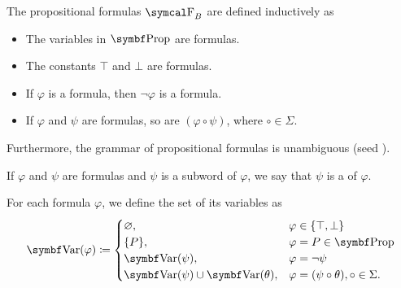 \begin{definition}\label{def:propositional_formulas}
  The propositional formulas \( \CF_B \) are defined inductively as
  \begin{itemize}
    \item The variables in \( \Bold{Prop} \) are formulas.
    \item The constants \( \top \) and \( \bot \) are formulas.
    \item If \( \varphi \) is a formula, then \( \neg \varphi \) is a formula.
    \item If \( \varphi \) and \( \psi \) are formulas, so are \( (\varphi \circ \psi) \), where \( \circ \in \Sigma \).
  \end{itemize}

  Furthermore, the grammar of propositional formulas is unambiguous (seed ).

  If \( \varphi \) and \( \psi \) are formulas and \( \psi \) is a subword of \( \varphi \), we say that \( \psi \) is a  of \( \varphi \).

  For each formula \( \varphi \), we define the set of its variables as
  \begin{align*}
    \Bold{Var}(\varphi) \coloneqq \begin{cases}
      \varnothing,                              &\varphi \in \{ \top, \bot \} \\
      \{ P \},                                  &\varphi = P \in \Bold{Prop} \\
      \Bold{Var}(\psi),                         &\varphi = \neg \psi \\
      \Bold{Var}(\psi) \cup \Bold{Var}(\theta), &\varphi = (\psi \circ \theta), \circ \in \Sigma.
    \end{cases}
  \end{align*}
\end{definition}

